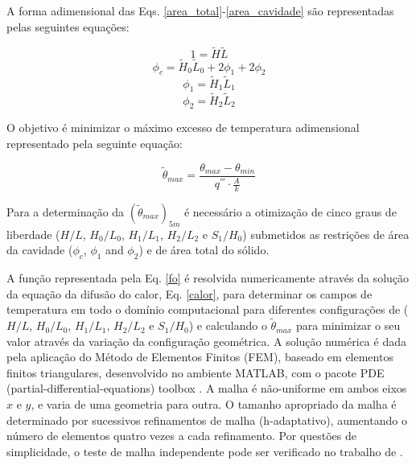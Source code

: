 \documentclass[12pt,A4,A4pt]{article}
\begin{document}
A forma adimensional das Eqs. \ref{area_total}-\ref{area_cavidade} são representadas pelas seguintes equações:

\begin{equation}
1  = \tilde{H}\tilde{L}\label{total_area_adim}
\end{equation}
\begin{equation}
\phi_{c}=\tilde{H}_{0}\tilde{L}_{0}+2\phi_{1}+2\phi_{2}\label{fi_c}
\end{equation}
\begin{equation}
\phi_{1}=\tilde{H}_{1}\tilde{L}_{1}\label{fi_1}
\end{equation}
\begin{equation}
\phi_{2}=\tilde{H}_{2}\tilde{L}_{2}\label{fi_2}
\end{equation}

O objetivo é minimizar o máximo excesso de temperatura adimensional representado pela seguinte equação:

\begin{equation}
\tilde{\theta}_{max}=\frac{\theta_{max}-\theta_{min}}{q^{'''}\cdot\frac{A}{k}}\label{fo}
\end{equation}

Para a determinação da $(\tilde{\theta}_{max})_{5m}$ é necessário a otimização de cinco graus de liberdade ($H/L$, $H_{0}/L_{0}$, $H_{1}/L_{1}$, $H_{2}/L_{2}$ e $S_{1}/H_{0}$) submetidos as restrições de área da cavidade ($\phi_{c}$, $\phi_{1}$ and $\phi_{2}$) e de área total do sólido.

A função representada pela Eq. \ref{fo} é resolvida numericamente através da  solução da equação da difusão do calor, Eq. \ref{calor}, para determinar os campos de temperatura em todo o domínio computacional para diferentes configurações de ($H/L$, $H_{0}/L_{0}$, $H_{1}/L_{1}$, $H_{2}/L_{2}$ e $S_{1}/H_{0}$) e calculando o $\tilde{\theta}_{max}$ para minimizar o seu valor através da variação da configuração geométrica. A solução numérica é dada pela aplicação do Método de Elementos Finitos (FEM), baseado em elementos finitos triangulares, desenvolvido no ambiente MATLAB, com o pacote PDE (partial-differential-equations) toolbox \citep{Reddy1994}. A malha é não-uniforme em ambos eixos $x$ e $y$, e varia de uma geometria para outra. O tamanho apropriado da malha é determinado por sucessivos refinamentos de malha (h-adaptativo), aumentando o número de elementos quatro vezes a cada refinamento. Por questões de simplicidade, o teste de malha independente pode ser verificado no trabalho de \cite{Gonzales2015cilamce}.
\end{document}
